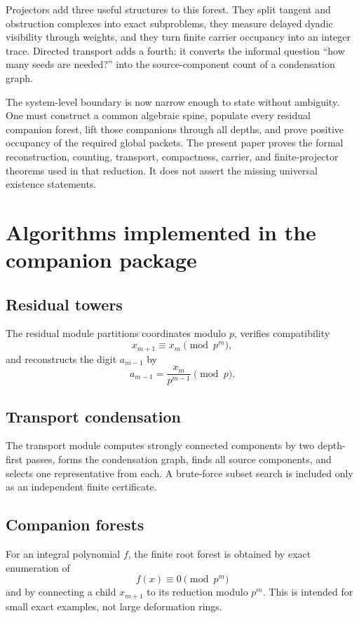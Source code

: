 \documentclass[11pt]{article}
\theoremstyle{definition}
\theoremstyle{remark}
\begin{document}
Projectors add three useful structures to this forest.  They split tangent and obstruction complexes into exact subproblems, they measure delayed dyadic visibility through weights, and they turn finite carrier occupancy into an integer trace.  Directed transport adds a fourth: it converts the informal question ``how many seeds are needed?'' into the source-component count of a condensation graph.

The system-level boundary is now narrow enough to state without ambiguity.  One must construct a common algebraic spine, populate every residual companion forest, lift those companions through all depths, and prove positive occupancy of the required global packets.  The present paper proves the formal reconstruction, counting, transport, compactness, carrier, and finite-projector theorems used in that reduction.  It does not assert the missing universal existence statements.

\appendix

\section{Algorithms implemented in the companion package}

\subsection{Residual towers}

The residual module partitions coordinates modulo \(p\), verifies compatibility
\[
x_{m+1}\equiv x_m\pmod{p^m},
\]
and reconstructs the digit \(a_{m-1}\) by
\[
a_{m-1}=\frac{x_m}{p^{m-1}}\pmod p.
\]

\subsection{Transport condensation}

The transport module computes strongly connected components by two depth-first passes, forms the condensation graph, finds all source components, and selects one representative from each.  A brute-force subset search is included only as an independent finite certificate.

\subsection{Companion forests}

For an integral polynomial \(f\), the finite root forest is obtained by exact enumeration of
\[
f(x)\equiv0\pmod{p^m}
\]
and by connecting a child \(x_{m+1}\) to its reduction modulo \(p^m\).  This is intended for small exact examples, not large deformation rings.
\end{document}
